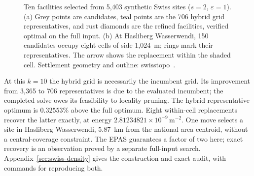 \documentclass[a4paper,12pt]{article}
\numberwithin{equation}{section}
\begin{document}
\begin{figure}[tbp]
{}

\caption{Ten facilities selected from 5,403 synthetic Swiss sites ($s=2$, $\varepsilon=1$).
(a) Grey points are candidates, teal points are the 706 hybrid grid representatives,
and rust diamonds are the refined facilities, verified optimal on the full input.
(b) At Hasliberg Wasserwendi, 150 candidates occupy eight cells of side 1,024~m;
rings mark their representatives. The arrow shows the replacement within the shaded
cell. Settlement geometry and outline: swisstopo~\cite{swissaddresses,swissboundary}.}\label{fig:swiss}
\end{figure}

At this $k=10$ the hybrid grid is necessarily the incumbent grid. Its improvement from
3,365 to 706 representatives is due to the evaluated incumbent; the completed solve owes its
feasibility to locality pruning. The hybrid representative optimum is $0.32553\%$ above the full optimum.
Eight within-cell replacements recover the latter exactly, at energy
$2.81234821\times10^{-9}\,\mathrm{m}^{-2}$. One move selects a site
in Hasliberg Wasserwendi, 5.87~km from the national area centroid, without a
central-coverage constraint. The EPAS guarantees a factor of two here; exact
recovery is an observation proved by a separate full-input search.
Appendix~\ref{sec:swiss-density} gives the construction and exact audit, with commands for
reproducing both.
\end{document}
